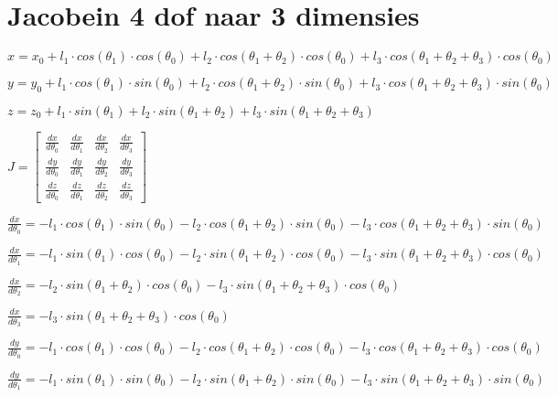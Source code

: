 \section{Jacobein 4 dof naar 3 dimensies}

$ x = x_0 + l_1 \cdot cos(\theta_1) \cdot cos(\theta_0) + l_2 \cdot cos(\theta_1 + \theta_2) \cdot cos(\theta_0) + l_3 \cdot cos(\theta_1 + \theta_2 + \theta_3) \cdot cos(\theta_0)$

$ y = y_0 + l_1 \cdot cos(\theta_1) \cdot sin(\theta_0) + l_2 \cdot cos(\theta_1 + \theta_2) \cdot sin(\theta_0) + l_3 \cdot cos(\theta_1 + \theta_2 + \theta_3) \cdot sin(\theta_0) $

$ z = z_0 + l_1 \cdot sin(\theta_1) + l_2 \cdot sin(\theta_1 + \theta_2) + l_3 \cdot sin(\theta_1 + \theta_2 + \theta_3) $




$
J =
\begin{bmatrix}
\frac{dx}{d\theta_0} & \frac{dx}{d\theta_1} & \frac{dx}{d\theta_2}& \frac{dx}{d\theta_3} \\
\frac{dy}{d\theta_0} & \frac{dy}{d\theta_1} & \frac{dy}{d\theta_2} & \frac{dy}{d\theta_3} \\
\frac{dz}{d\theta_0} & \frac{dz}{d\theta_1} & \frac{dz}{d\theta_2} & \frac{dz}{d\theta_3}
\end{bmatrix}
$

$\frac{dx}{d\theta_0} = -l_1\cdot cos(\theta_1) \cdot sin(\theta_0) -l_2\cdot  cos(\theta_1 + \theta_2) \cdot sin(\theta_0) -l_3\cdot  cos(\theta_1 + \theta_2 + \theta_3 ) \cdot sin(\theta_0)
$

 $\frac{dx}{d\theta_1} = -l_1\cdot sin(\theta_1) \cdot cos(\theta_0) -l_2\cdot  sin(\theta_1 + \theta_2) \cdot cos(\theta_0) - l_3\cdot  sin(\theta_1 + \theta_2 + \theta_3 ) \cdot cos(\theta_0)	
 $

 $\frac{dx}{d\theta_2} = -l_2\cdot  sin(\theta_1 + \theta_2) \cdot cos(\theta_0) - l_3\cdot  sin(\theta_1 + \theta_2 + \theta_3 ) \cdot cos(\theta_0)
 $

 $\frac{dx}{d\theta_3} = - l_3\cdot  sin(\theta_1 + \theta_2 + \theta_3 ) \cdot cos(\theta_0)	
 $

 
$\frac{dy}{d\theta_0} = -l_1\cdot cos(\theta_1) \cdot cos(\theta_0) -l_2\cdot  cos(\theta_1 + \theta_2) \cdot cos(\theta_0) -l_3\cdot  cos(\theta_1 + \theta_2 + \theta_3 ) \cdot cos(\theta_0) $

$\frac{dy}{d\theta_1} = -l_1\cdot sin(\theta_1) \cdot sin(\theta_0) -l_2\cdot  sin(\theta_1 + \theta_2) \cdot sin(\theta_0) -l_3\cdot  sin(\theta_1 + \theta_2 + \theta_3 ) \cdot sin(\theta_0)$

